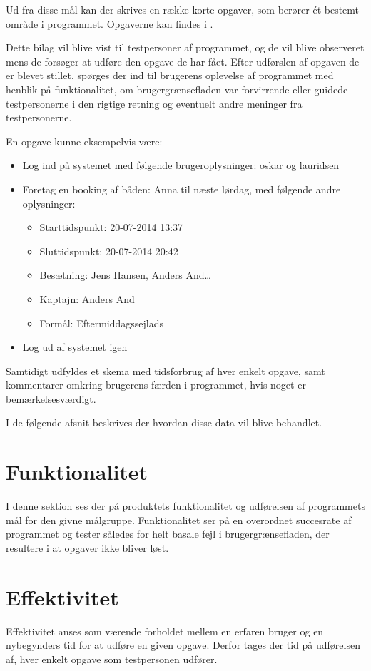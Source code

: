 Ud fra disse mål kan der skrives en række korte opgaver, som berører ét bestemt område i programmet. 
Opgaverne kan findes i .

Dette bilag vil blive vist til testpersoner af programmet, og de vil blive observeret mens de forsøger at udføre den opgave de har fået. 
Efter udførslen af opgaven de er blevet stillet, spørges der ind til brugerens oplevelse af programmet med henblik på funktionalitet, om brugergrænsefladen var forvirrende eller guidede testpersonerne i den rigtige retning og eventuelt andre meninger fra testpersonerne.

En opgave kunne eksempelvis være:
\begin{itemize}
	\item Log ind på systemet med følgende brugeroplysninger: oskar og lauridsen
	\item Foretag en booking af båden: Anna til næste lørdag, med følgende andre oplysninger: 
	\begin{itemize}
		\item Starttidspunkt: 20-07-2014 13:37
		\item Sluttidspunkt: 20-07-2014 20:42
		\item Besætning: Jens Hansen, Anders And\ldots
		\item Kaptajn: Anders And
		\item Formål: Eftermiddagssejlads
	\end{itemize}
	\item Log ud af systemet igen
\end{itemize}

Samtidigt udfyldes et skema med tidsforbrug af hver enkelt opgave, samt kommentarer omkring brugerens færden i programmet, hvis noget er bemærkelsesværdigt. 

I de følgende afsnit beskrives der hvordan disse data vil blive behandlet.

\section{Funktionalitet}
I denne sektion ses der på produktets funktionalitet og udførelsen af programmets mål for den givne målgruppe.
Funktionalitet ser på en overordnet succesrate af programmet og tester således for helt basale fejl i brugergrænsefladen, der resultere i at opgaver ikke bliver løst. 

\section{Effektivitet}
Effektivitet anses som værende forholdet mellem en erfaren bruger og en nybegynders tid for at udføre en given opgave.\citep{UIEffeciency}
Derfor tages der tid på udførelsen af, hver enkelt opgave som testpersonen udfører.

